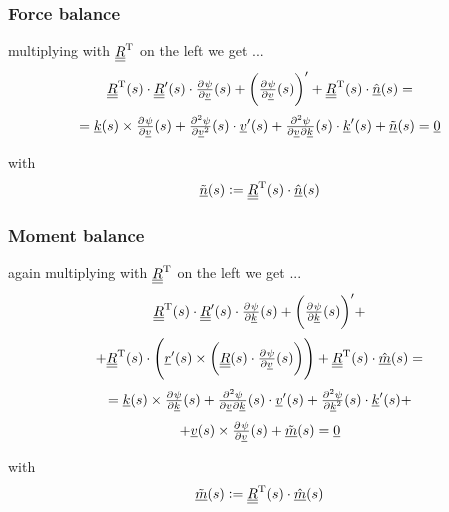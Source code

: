 \begin{frame}
  \frametitle{Force balance}
  multiplying with $\underline{\underline{R}}^{\mathrm{T}}$ on the left we get ...
  \begin{displaymath}
    \doubleunderline{R}^{\mathrm{T}}(s) \cdot
    \doubleunderline{R}^{\prime}(s) \cdot \pd{\psi}{\underline{v}}(s) +
    \biggl( \pd{\psi}{\underline{v}}(s) \biggr)^{\prime} +
    \doubleunderline{R}^{\mathrm{T}}(s) \cdot \underline{\hat{n}}(s) =
  \end{displaymath}
  \begin{displaymath}
    = \underline{k}(s) \times \pd{\psi}{\underline{v}}(s) +
    \pd[2]{\psi}{\underline{v}}(s) \cdot \underline{v}^{\prime}(s) +
    \md{\psi}{2}{\underline{v}}{}{\underline{k}}{}(s) \cdot \underline{k}^{\prime}(s) +
    \underline{\tilde{n}}(s) =
    \underline{0}
  \end{displaymath}
  
  with
  \begin{displaymath}
    \underline{\tilde{n}}(s) :=
    \underline{\underline{R}}^{\mathrm{T}}(s) \cdot \underline{\hat{n}}(s)
  \end{displaymath}
\end{frame}


\begin{frame}
  \frametitle{Moment balance}
  again multiplying with $\underline{\underline{R}}^{\mathrm{T}}$ on the left we get ...
  \begin{displaymath}
    \doubleunderline{R}^{\mathrm{T}}(s) \cdot
    \doubleunderline{R}^{\prime}(s) \cdot \pd{\psi}{\underline{k}}(s) +
    \biggl( \pd{\psi}{\underline{k}}(s) \biggr)^{\prime} +
  \end{displaymath}
  \begin{displaymath}
    + \doubleunderline{R}^{\mathrm{T}}(s) \cdot \Biggl(
    \underline{r}^{\prime}(s) \times \biggl( \doubleunderline{R}(s) \cdot \pd{\psi}{\underline{v}}(s) \biggr) \Biggr) +
    \doubleunderline{R}^{\mathrm{T}}(s) \cdot
    \underline{\hat{m}}(s) =
  \end{displaymath}
  \begin{displaymath}
    = \underline{k}(s) \times \pd{\psi}{\underline{k}}(s) +
    \md{\psi}{2}{\underline{v}}{}{\underline{k}}{}(s) \cdot \underline{v}^{\prime}(s) +
    \pd[2]{\psi}{\underline{k}}(s) \cdot \underline{k}^{\prime}(s) +
  \end{displaymath}
  \begin{displaymath}
    + \underline{v}(s) \times \pd{\psi}{\underline{v}}(s) +
    \underline{\tilde{m}}(s) =
    \underline{0}
  \end{displaymath}
  
  with
  \begin{displaymath}
    \underline{\tilde{m}}(s) :=
    \underline{\underline{R}}^{\mathrm{T}}(s) \cdot \underline{\hat{m}}(s)
  \end{displaymath}
\end{frame}


